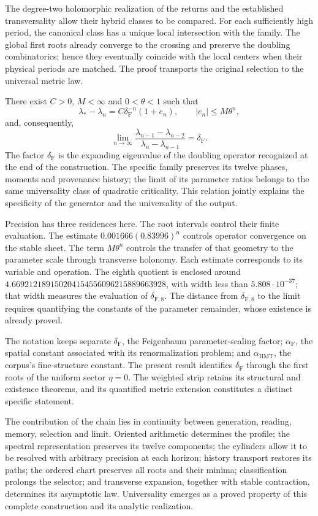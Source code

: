 The degree-two holomorphic realization of the returns and the established
transversality allow their hybrid classes to be compared. For each sufficiently
high period, the canonical class has a unique local intersection
with the family. The global first roots already converge to the crossing and
preserve the doubling combinatorics; hence they eventually coincide
with the local centers when their physical periods are matched. The proof
transports the original selection to the universal metric law.

There exist \(C>0\), \(M<\infty\) and \(0<\theta<1\) such that
\[
\lambda_*-\lambda_n=C\delta_{\mathrm F}^{-n}(1+e_n),
\qquad |e_n|\le M\theta^n,
\]
and, consequently,
\[
\lim_{n\to\infty}
\frac{\lambda_{n-1}-\lambda_{n-2}}
{\lambda_n-\lambda_{n-1}}=\delta_{\mathrm F}.
\]
The factor \(\delta_{\mathrm F}\) is the expanding eigenvalue of the doubling operator
recognized at the end of the construction. The specific family preserves its
twelve phases, moments and provenance history; the limit of its
parameter ratios belongs to the same universality class of quadratic
criticality. This relation jointly explains the specificity of the
generator and the universality of the output.

Precision has three residences here. The root intervals
control their finite evaluation. The estimate
\(0.001666(0.83996)^n\) controls operator convergence on the stable
sheet. The term \(M\theta^n\) controls the transfer of that geometry to
the parameter scale through transverse holonomy. Each estimate
corresponds to its variable and operation. The eighth quotient is enclosed
around \(4.669212189150204154556096215889663928\), with width less
than \(5.808\cdot10^{-37}\); that width measures the evaluation of \(\delta_{\mathrm F,8}\).
The distance from \(\delta_{\mathrm F,8}\) to the limit requires quantifying the constants
of the parameter remainder, whose existence is already proved.

The notation keeps separate \(\delta_{\mathrm F}\), the Feigenbaum parameter-scaling
factor; \(\alpha_{\mathrm F}\), the spatial constant associated with its
renormalization problem; and \(\alpha_{\mathrm{HMT}}\), the corpus’s fine-structure
constant. The present result identifies \(\delta_{\mathrm F}\)
through the first roots of the uniform sector \(\eta=0\). The weighted
strip retains its structural and existence theorems, and its quantified
metric extension constitutes a distinct specific statement.

The contribution of the chain lies in continuity between generation,
reading, memory, selection and limit. Oriented arithmetic determines the
profile; the spectral representation preserves its twelve components; the
cylinders allow it to be resolved with arbitrary precision at each horizon;
history transport restores its paths; the ordered chart
preserves all roots and their minima; classification prolongs the
selector; and transverse expansion, together with stable contraction,
determines its asymptotic law. Universality emerges as a proved
property of this complete construction and its analytic realization.
